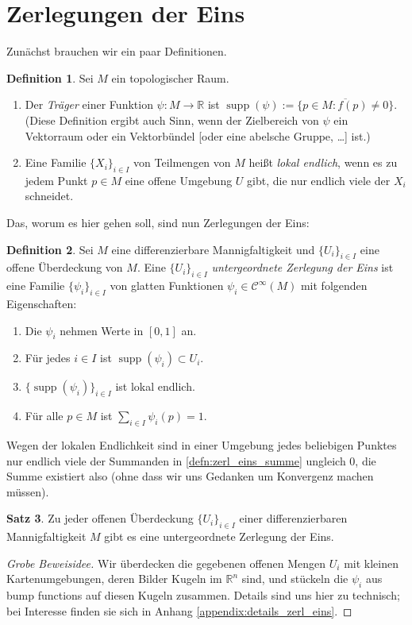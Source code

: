 \documentclass[a4paper]{scrreprt}
\numberwithin{equation}{chapter}
\DeclareMathOperator{\supp}{supp}
\newcommand{\R}{\mathbb{R}}
\newcommand{\sC}{\mathcal{C}^{\infty}}
\theoremstyle{definition}
\newtheorem{defn}{Definition}[section]
\newtheorem{satz}[defn]{Satz}
\begin{document}
\section{Zerlegungen der Eins}
Zunächst brauchen wir ein paar Definitionen.
\begin{defn}
	Sei $M$ ein topologischer Raum.
	\begin{enumerate}[label=(\alph*)]
		\item Der \emph{Träger} einer Funktion $\psi\colon M \to \R$ ist $\supp(\psi) := \overline{\{p \in M \colon f(p) \ne 0\}}$. (Diese Definition ergibt auch Sinn, wenn der Zielbereich von $\psi$ ein Vektorraum oder ein Vektorbündel [oder eine abelsche Gruppe, \dots] ist.)
		\item Eine Familie $\{X_i\}_{i\in I}$ von Teilmengen von $M$ heißt \emph{lokal endlich}, wenn es zu jedem Punkt $p\in M$ eine offene Umgebung $U$ gibt, die nur endlich viele der $X_i$ schneidet.
	\end{enumerate}
\end{defn}
Das, worum es hier gehen soll, sind nun Zerlegungen der Eins:
\begin{defn}
	Sei $M$ eine differenzierbare Mannigfaltigkeit und $\{U_i\}_{i\in I}$ eine offene Überdeckung von $M$. Eine $\{U_i\}_{i\in I}$ \emph{untergeordnete Zerlegung der Eins} ist eine Familie $\{\psi_i\}_{i\in I}$ von glatten Funktionen $\psi_i \in \sC(M)$ mit folgenden Eigenschaften:
	\begin{enumerate}[label=(\roman*)]
		\item Die $\psi_i$ nehmen Werte in $[0,1]$ an.
		\item Für jedes $i\in I$ ist $\supp(\psi_i) \subset U_i$.
		\item $\{\supp(\psi_i)\}_{i\in I}$ ist lokal endlich.
		\item \label{defn:zerl_eins_summe} Für alle $p\in M$ ist $\sum_{i\in I} \psi_i(p) = 1$.
	\end{enumerate}
	Wegen der lokalen Endlichkeit sind in einer Umgebung jedes beliebigen Punktes nur endlich viele der Summanden in \ref{defn:zerl_eins_summe} ungleich 0, die Summe existiert also (ohne dass wir uns Gedanken um Konvergenz machen müssen).
\end{defn}

\begin{satz} \label{satz:zerl_eins}
	Zu jeder offenen Überdeckung $\{U_i\}_{i\in I}$ einer differenzierbaren Mannigfaltigkeit $M$ gibt es eine untergeordnete Zerlegung der Eins.

	\begin{proof}[Grobe Beweisidee]
		Wir überdecken die gegebenen offenen Mengen $U_i$ mit kleinen Kartenumgebungen, deren Bilder Kugeln im $\R^n$ sind, und stückeln die $\psi_i$ aus bump functions auf diesen Kugeln zusammen. Details sind uns hier zu technisch; bei Interesse finden sie sich in Anhang \ref{appendix:details_zerl_eins}.
	\end{proof}
\end{satz}
\end{document}
